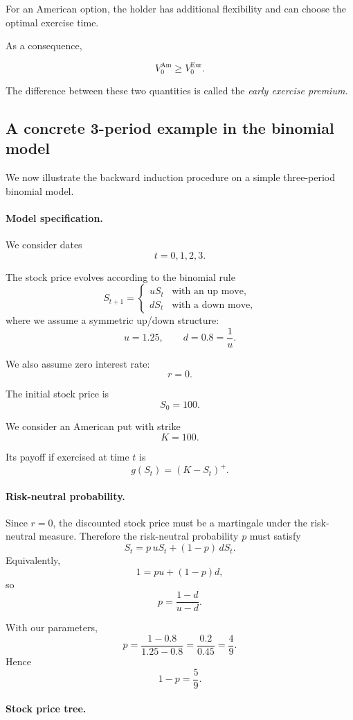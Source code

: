 \documentclass[11pt]{article}
\theoremstyle{definition}
\theoremstyle{plain}
\begin{document}
For an American option, the holder has additional flexibility and can
choose the optimal exercise time.

As a consequence,

\[
V_0^{\text{Am}} \ge V_0^{\text{Eur}}.
\]

The difference between these two quantities is called the
\emph{early exercise premium}.

\subsection{A concrete 3-period example in the binomial model}

We now illustrate the backward induction procedure on a simple
three-period binomial model.

\paragraph{Model specification.}

We consider dates
\[
t=0,1,2,3.
\]

The stock price evolves according to the binomial rule
\[
S_{t+1}=
\begin{cases}
u S_t & \text{with an up move},\\
d S_t & \text{with a down move},
\end{cases}
\]
where we assume a symmetric up/down structure:
\[
u=1.25,
\qquad
d=0.8=\frac1u.
\]

We also assume zero interest rate:
\[
r=0.
\]

The initial stock price is
\[
S_0=100.
\]

We consider an American put with strike
\[
K=100.
\]

Its payoff if exercised at time \(t\) is
\[
g(S_t)=(K-S_t)^+.
\]

\paragraph{Risk-neutral probability.}

Since \(r=0\), the discounted stock price must be a martingale under
the risk-neutral measure.
Therefore the risk-neutral probability \(p\) must satisfy
\[
S_t = p\,uS_t + (1-p)\,dS_t.
\]
Equivalently,
\[
1=pu+(1-p)d,
\]
so
\[
p=\frac{1-d}{u-d}.
\]

With our parameters,
\[
p=\frac{1-0.8}{1.25-0.8}
=\frac{0.2}{0.45}
=\frac49.
\]
Hence
\[
1-p=\frac59.
\]

\paragraph{Stock price tree.}
\end{document}
